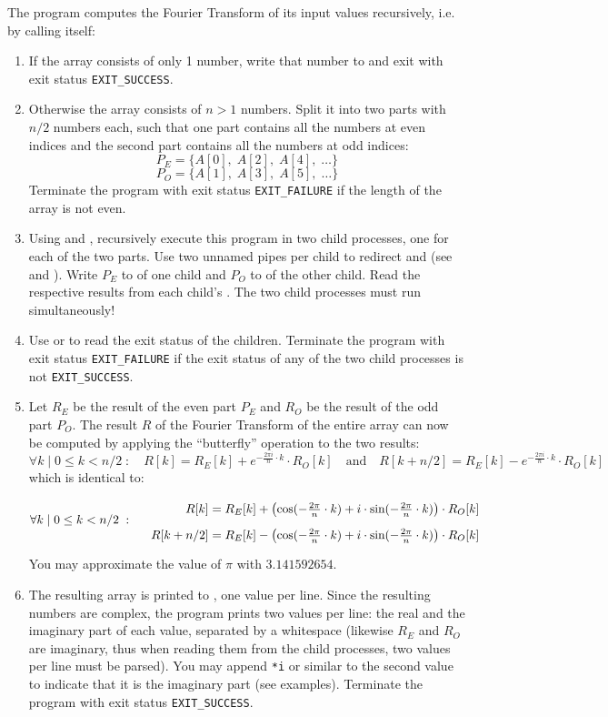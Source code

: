 The program computes the Fourier Transform of its input values recursively,
i.e. by calling itself:
\begin{enumerate}
\item If the array consists of only 1 number, write that number to 
and exit with exit status \verb|EXIT_SUCCESS|.
\item Otherwise the array consists of $n>1$ numbers.
Split it into two parts with $n/2$ numbers each,
such that one part contains all the numbers at even indices
and the second part contains all the numbers at odd indices:
\[
P_E=\{A[0],\;A[2],\;A[4],\;\dots\}
\]
\[
P_O=\{A[1],\;A[3],\;A[5],\;\dots\}
\]
Terminate the program with exit status \verb|EXIT_FAILURE|
if the length of the array is not even.

\item Using  and ,
recursively execute this program in two child processes,
one for each of the two parts.
Use two unnamed pipes per child
to redirect  and 
(see  and ).
Write $P_E$ to  of one child
and $P_O$ to  of the other child.
Read the respective results from each child's .
The two child processes must run simultaneously!

\item Use  or 
to read the exit status of the children.
Terminate the program with exit status \verb|EXIT_FAILURE|
if the exit status of any of the two child processes is not \verb|EXIT_SUCCESS|.

\item Let $R_E$ be the result of the even part $P_E$
and $R_O$ be the result of the odd part $P_O$.
The result $R$ of the Fourier Transform of the entire array can now be computed
by applying the ``butterfly'' operation to the two results:
\[
\forall k\;|\;0\leq k<n/2\;:\quad R[k]=R_E[k]+e^{-\frac{2\pi i}{n}\cdot k}\cdot R_O[k]
\quad\text{and}\quad R[k+n/2]=R_E[k]-e^{-\frac{2\pi i}{n}\cdot k}\cdot R_O[k]
\]
which is identical to:
\[
\forall k\;|\;0\leq k<n/2\;:\quad
\renewcommand{\arraystretch}{1.8}
\begin{array}{r@{\;=\;}l}
 R[k]     & R_E[k]+\left(\text{cos}(-\frac{2\pi}{n}\cdot k)+i\cdot\text{sin}(-\frac{2\pi}{n}\cdot k)\right)\cdot R_O[k]\\
R[k+n/2] & R_E[k]-\left(\text{cos}(-\frac{2\pi}{n}\cdot k)+i\cdot\text{sin}(-\frac{2\pi}{n}\cdot k)\right)\cdot R_O[k]
\end{array}
\]
You may approximate the value of $\pi$ with $3.141592654$.
\item The resulting array is printed to , one value per line.
Since the resulting numbers are complex, the program prints two values per line:
the real and the imaginary part of each value, separated by a whitespace
(likewise $R_E$ and $R_O$ are imaginary,
thus when reading them from the child processes,
two values per line must be parsed).
You may append \verb|*i| or similar to the second value
to indicate that it is the imaginary part (see examples).
Terminate the program with exit status \verb|EXIT_SUCCESS|.


\end{enumerate}
